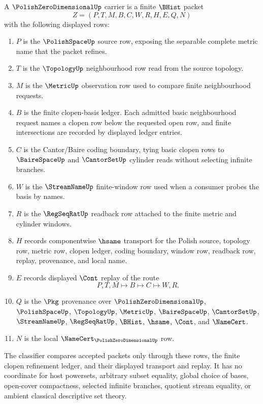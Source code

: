 \begin{definition}
\label{def:polish-zero-dimensional-carrier}
A $\PolishZeroDimensionalUp$ carrier is a finite $\BHist$ packet
$$
Z=(P,T,M,B,C,W,R,H,E,Q,N)
$$
with the following displayed rows:
\begin{enumerate}
\item $P$ is the $\PolishSpaceUp$ source row, exposing the separable complete metric name that the packet refines.
\item $T$ is the $\TopologyUp$ neighbourhood row read from the source topology.
\item $M$ is the $\MetricUp$ observation row used to compare finite neighbourhood requests.
\item $B$ is the finite clopen-basis ledger. Each admitted basic neighbourhood request names a clopen row below the requested open row, and finite intersections are recorded by displayed ledger entries.
\item $C$ is the Cantor/Baire coding boundary, tying basic clopen rows to $\BaireSpaceUp$ and $\CantorSetUp$ cylinder reads without selecting infinite branches.
\item $W$ is the $\StreamNameUp$ finite-window row used when a consumer probes the basis by names.
\item $R$ is the $\RegSeqRatUp$ readback row attached to the finite metric and cylinder windows.
\item $H$ records componentwise $\hsame$ transport for the Polish source, topology row, metric row, clopen ledger, coding boundary, window row, readback row, replay, provenance, and local name.
\item $E$ records displayed $\Cont$ replay of the route
$$
P,T,M \longmapsto B \longmapsto C \longmapsto W,R .
$$
\item $Q$ is the $\Pkg$ provenance over $\PolishZeroDimensionalUp$, $\PolishSpaceUp$, $\TopologyUp$, $\MetricUp$, $\BaireSpaceUp$, $\CantorSetUp$, $\StreamNameUp$, $\RegSeqRatUp$, $\BHist$, $\hsame$, $\Cont$, and $\NameCert$.
\item $N$ is the local $\NameCert_{\PolishZeroDimensionalUp}$ row.
\end{enumerate}
The classifier compares accepted packets only through these rows, the finite clopen refinement ledger, and their displayed transport and replay. It has no coordinate for host powersets, arbitrary subset equality, global choice of bases, open-cover compactness, selected infinite branches, quotient stream equality, or ambient classical descriptive set theory.
\end{definition}

